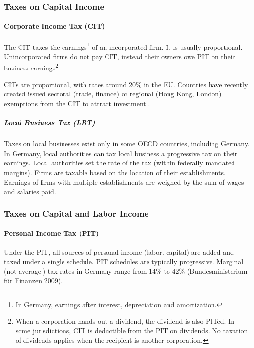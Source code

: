 \subsubsection{Taxes on Capital Income}

\paragraph{Corporate Income Tax (CIT)}  \label{sec:CIT} The  \gls{CIT} taxes the earnings\footnote{In Germany, earnings after interest, depreciation and amortization.} of an incorporated firm. It is usually proportional. Unincorporated firms do not pay \gls{CIT}, instead their owners owe \gls{PIT} on their business earnings\footnote{
	When a corporation hands out a dividend, the dividend is also \gls{PIT}ed. In some jurisdictions, \gls{CIT} is deductible from the \gls{PIT} on dividends. No taxation of dividends applies when the recipient is another corporation.}.

\glspl{CIT} are proportional, with rates around 20\% in the EU. Countries have recently created issued sectoral (trade, finance) or regional (Hong Kong, London) exemptions from the \gls{CIT} to attract investment \citep{Genschel2009,Ganghof2007,Genschel2005}.

\subparagraph{Local Business Tax (LBT)}  \label{sec:LBT} Taxes on local businesses exist only in some OECD countries, including Germany. In Germany, local authorities can tax local business a progressive tax on their earnings. Local authorities set the rate of the tax (within federally mandated margins). Firms are taxable based on the location of their establishments. Earnings of firms with multiple establishments are weighed by the sum of wages and salaries paid.

\subsubsection{Taxes on Capital and Labor Income}

\paragraph{Personal Income Tax (PIT)}  \label{sec:PIT} Under the  \gls{PIT}, all sources of personal income (labor, capital) are added and taxed under a single schedule. \gls{PIT} schedules are typically progressive. Marginal (not average!) tax rates in Germany range from 14\% to 42\% (Bundesministerium f\"ur Finanzen 2009). 

